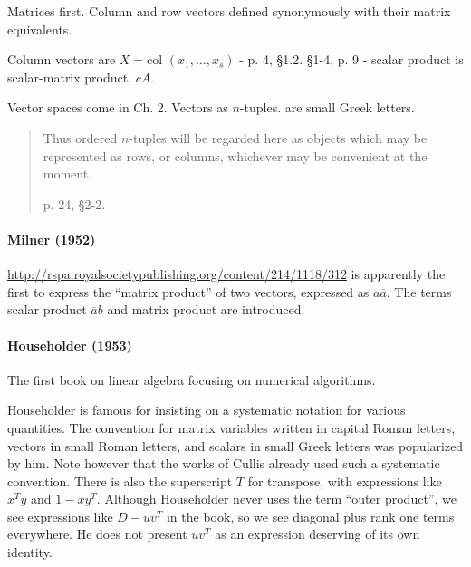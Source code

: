 Matrices first. Column and row vectors defined synonymously with their matrix equivalents.

Column vectors are $X = \textrm{col }(x_1, \dots, x_s)$ - p. 4, \S 1.2.
\S 1-4, p. 9 - scalar product is scalar-matrix product, $c A$.

Vector spaces come in Ch. 2. Vectors as $n$-tuples. are small Greek letters.

\begin{quote}
Thus ordered $n$-tuples will be regarded here as objects which may be
represented as rows, or columns, whichever may be convenient at the moment.

p. 24, \S2-2.
\end{quote}



\paragraph{Milner (1952)}

\url{http://rspa.royalsocietypublishing.org/content/214/1118/312}
is apparently the first to express the ``matrix product'' of two vectors,
expressed as $a \overline{a}$.  The terms scalar product $\overline{a} b$ and
matrix product are introduced.



\paragraph{Householder (1953)~\cite{Householder1953}}

The first book on linear algebra focusing on numerical algorithms.

Householder is famous for insisting on a systematic notation for various
quantities.  The convention for matrix variables written in capital Roman
letters, vectors in small Roman letters, and scalars in small Greek letters was
popularized by him. Note however that the works of Cullis already used such a
systematic convention.
There is also the superscript $T$ for transpose, with expressions like $x^T y$
and $1 - x y^T$.  Although Householder never uses the term ``outer product'',
we see expressions like $D - u v^T$ in the book, so we see diagonal plus rank
one terms everywhere. He does not present $u v^T$ as an expression deserving of
its own identity.

